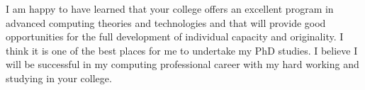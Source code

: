 \documentclass[12pt]{article}
\def\footerlink{}
\begin{document}
I am happy to have learned that your college offers an excellent program in advanced computing theories and technologies and that will provide good opportunities for the full development of individual capacity and originality. I think it is one of the best places for me to undertake my PhD studies. 
I believe I will be successful in my computing professional career with my hard working and studying in your college.



\end{document}
